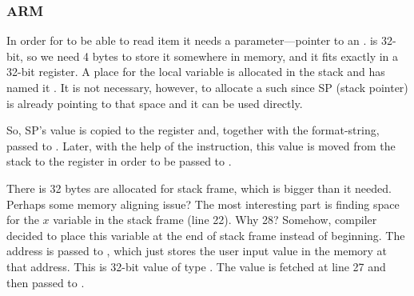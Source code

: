 \subsubsection{ARM}

\myparagraph{\OptimizingKeilVI (\ThumbMode)}



\myindex{\CLanguageElements!\Pointers}

In order for \scanf to be able to read item it needs a parameter---pointer to an \Tint.
\Tint is 32-bit, so we need 4 bytes to store it somewhere in memory, and it fits exactly in a 32-bit register.
A place for the local variable  is allocated in the stack and \IDA
has named it . It is not necessary, however, to allocate a such since \ac{SP} (\gls{stack pointer}) is already pointing to that space and it can be used directly.

So, \ac{SP}'s value is copied to the  register and, together with the format-string, passed to \scanf.
Later, with the help of the  instruction, this value is moved from the stack to the  register in order to be passed to \printf.




There is 32 bytes are allocated for stack frame, which is bigger than it needed. Perhaps some memory aligning issue?
The most interesting part is finding space for the $x$ variable in the stack frame (line 22).
Why 28? Somehow, compiler decided to place this variable at the end of stack frame instead of beginning.
The address is passed to \scanf, which just stores the user input value in the memory at that address.
This is 32-bit value of type \Tint.
The value is fetched at line 27 and then passed to \printf.

